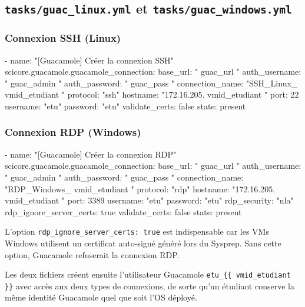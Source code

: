 \documentclass[a4paper]{article}
\newcommand{\cmd}[1]{\texttt{#1}}
\begin{document}
\subsection{\texttt{tasks/guac\_linux.yml} et \texttt{tasks/guac\_windows.yml}}

\subsubsection*{Connexion SSH (Linux)}

\begin{yamlcode}
- name: "[Guacamole] Créer la connexion SSH"
  scicore.guacamole.guacamole_connection:
    base_url:        "{{ guac_url }}"
    auth_username:   "{{ guac_admin }}"
    auth_password:   "{{ guac_pass }}"
    connection_name: "SSH_Linux_{{ vmid_etudiant }}"
    protocol:        "ssh"
    hostname:        "172.16.205.{{ vmid_etudiant }}"
    port:            22
    username:        "etu"
    password:        "etu"
    validate_certs:  false
    state:           present
\end{yamlcode}

\subsubsection*{Connexion RDP (Windows)}

\begin{yamlcode}
- name: "[Guacamole] Créer la connexion RDP"
  scicore.guacamole.guacamole_connection:
    base_url:                "{{ guac_url }}"
    auth_username:           "{{ guac_admin }}"
    auth_password:           "{{ guac_pass }}"
    connection_name:         "RDP_Windows_{{ vmid_etudiant }}"
    protocol:                "rdp"
    hostname:                "172.16.205.{{ vmid_etudiant }}"
    port:                    3389
    username:                "etu"
    password:                "etu"
    rdp_security:            "nla"
    rdp_ignore_server_certs: true
    validate_certs:          false
    state:                   present
\end{yamlcode}

L'option \cmd{rdp\_ignore\_server\_certs: true} est indispensable car les VMs Windows utilisent un certificat auto-signé généré lors du Sysprep. Sans cette option, Guacamole refuserait la connexion RDP.

Les deux fichiers créent ensuite l'utilisateur Guacamole \cmd{etu\_\{\{ vmid\_etudiant \}\}} avec accès aux deux types de connexions, de sorte qu'un étudiant conserve la même identité Guacamole quel que soit l'OS déployé.
\end{document}

